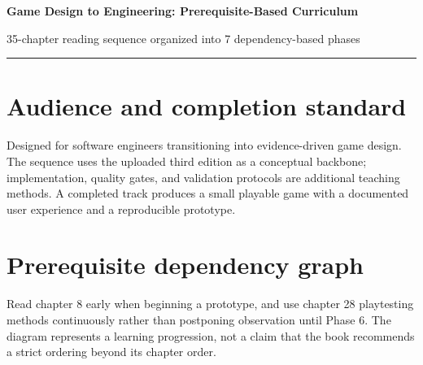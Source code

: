 \documentclass[11pt]{article}
\begin{document}
{\huge\bfseries\color{suiteblue} Game Design to Engineering: Prerequisite-Based Curriculum}\par
\vspace{0.15in}
{\normalsize\color{suitegray} 35-chapter reading sequence organized into 7 dependency-based phases}\par
\vspace{0.15in}\hrule\vspace{0.15in}

\section{Audience and completion standard}
Designed for software engineers transitioning into evidence-driven game design. The sequence uses the uploaded third edition as a conceptual backbone; implementation, quality gates, and validation protocols are additional teaching methods. A completed track produces a small playable game with a documented user experience and a reproducible prototype.


\section{Prerequisite dependency graph}
\begin{center}
\end{center}
Read chapter 8 early when beginning a prototype, and use chapter 28 playtesting methods continuously rather than postponing observation until Phase 6. The diagram represents a learning progression, not a claim that the book recommends a strict ordering beyond its chapter order.
\end{document}
